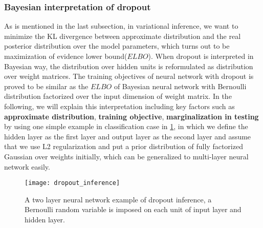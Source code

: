 \subsubsection{Bayesian interpretation of dropout}
As is mentioned in the last subsection, in variational inference, we want to minimize the KL divergence between approximate distribution and the real posterior distribution over the model parameters, which turns out to be maximization of evidence lower bound($ELBO$). When dropout is interpreted in Bayesian way, the distribution over hidden units is reformulated as distribution over weight matrices. The training objectives of neural network with dropout is proved to be similar as the $ELBO$ of Bayesian neural network with Bernoulli distribution factorized over the input dimension of weight matrix. In the following, we will explain this interpretation including key factors such as \textbf{approximate distribution}, \textbf{training objective}, \textbf{marginalization in testing} by using one simple example in {classification} case in \ref{fig:dropout_inference}, in which we define the hidden layer as the first layer and output layer as the second layer and assume that we use L2 regularization and put a prior distribution of fully factorized Gaussian over weights initially, which can be generalized to multi-layer neural network easily.


\begin{figure}[h!]
	\begin{center}
		\texttt{[image: dropout\_inference]}
		\caption{A two layer neural network example of dropout inference, a Bernoulli random variable is imposed on each unit of input layer and hidden layer.}		
		\label{fig:dropout_inference}
	\end{center}
\end{figure}

\newpage
